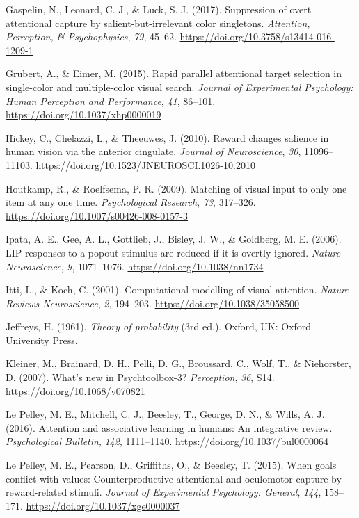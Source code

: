 \documentclass[man, a4paper, noextraspace, 11pt,floatsintext]{apa6}
\begin{document}
\hypertarget{ref-Gaspelin2016}{}
Gaspelin, N., Leonard, C. J., \& Luck, S. J. (2017). Suppression of
overt attentional capture by salient-but-irrelevant color singletons.
\emph{Attention, Perception, \& Psychophysics}, \emph{79}, 45--62.
\url{https://doi.org/10.3758/s13414-016-1209-1}

\hypertarget{ref-Grubert2015}{}
Grubert, A., \& Eimer, M. (2015). Rapid parallel attentional target
selection in single-color and multiple-color visual search.
\emph{Journal of Experimental Psychology: Human Perception and
Performance}, \emph{41}, 86--101.
\url{https://doi.org/10.1037/xhp0000019}

\hypertarget{ref-Hickey2010}{}
Hickey, C., Chelazzi, L., \& Theeuwes, J. (2010). Reward changes
salience in human vision via the anterior cingulate. \emph{Journal of
Neuroscience}, \emph{30}, 11096--11103.
\url{https://doi.org/10.1523/JNEUROSCI.1026-10.2010}

\hypertarget{ref-Houtkamp2009}{}
Houtkamp, R., \& Roelfsema, P. R. (2009). Matching of visual input to
only one item at any one time. \emph{Psychological Research}, \emph{73},
317--326. \url{https://doi.org/10.1007/s00426-008-0157-3}

\hypertarget{ref-Ipata2006}{}
Ipata, A. E., Gee, A. L., Gottlieb, J., Bisley, J. W., \& Goldberg, M.
E. (2006). LIP responses to a popout stimulus are reduced if it is
overtly ignored. \emph{Nature Neuroscience}, \emph{9}, 1071--1076.
\url{https://doi.org/10.1038/nn1734}

\hypertarget{ref-Itti2001}{}
Itti, L., \& Koch, C. (2001). Computational modelling of visual
attention. \emph{Nature Reviews Neuroscience}, \emph{2}, 194--203.
\url{https://doi.org/10.1038/35058500}

\hypertarget{ref-Jeffreys1961}{}
Jeffreys, H. (1961). \emph{Theory of probability} (3rd ed.). Oxford, UK:
Oxford University Press.

\hypertarget{ref-Kleiner2007}{}
Kleiner, M., Brainard, D. H., Pelli, D. G., Broussard, C., Wolf, T., \&
Niehorster, D. (2007). What's new in Psychtoolbox-3? \emph{Perception},
\emph{36}, S14. \url{https://doi.org/10.1068/v070821}

\hypertarget{ref-LePelleya}{}
Le Pelley, M. E., Mitchell, C. J., Beesley, T., George, D. N., \& Wills,
A. J. (2016). Attention and associative learning in humans: An
integrative review. \emph{Psychological Bulletin}, \emph{142},
1111--1140. \url{https://doi.org/10.1037/bul0000064}

\hypertarget{ref-LePelley2015b}{}
Le Pelley, M. E., Pearson, D., Griffiths, O., \& Beesley, T. (2015).
When goals conflict with values: Counterproductive attentional and
oculomotor capture by reward-related stimuli. \emph{Journal of
Experimental Psychology: General}, \emph{144}, 158--171.
\url{https://doi.org/10.1037/xge0000037}
\end{document}
